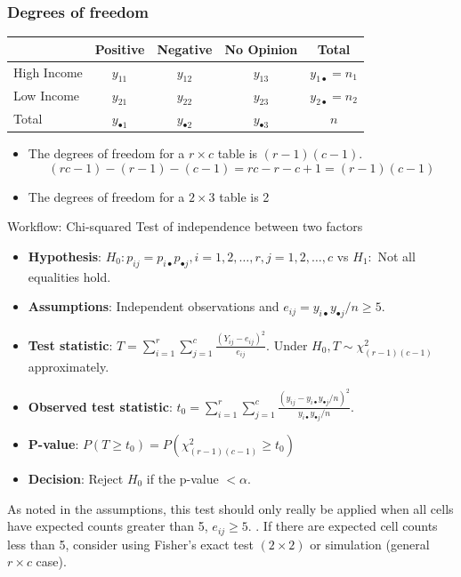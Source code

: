 \documentclass[a4paper]{article}
\begin{document}
\subsubsection{Degrees of freedom}
\begin{table}[H]
	\centering
	\begin{tabular}{@{}lccc|c@{}}
	\toprule
				& Positive  	      & Negative		    & No Opinion		  & Total                     \\ \midrule
	High Income & \( y_{11} \)		  & \( y_{12} \) 	    & \( y_{13} \) 		  & \( y_{1 \bullet} = n_1 \) \\
	Low Income  & \( y_{21} \) 		  & \( y_{22} \) 	    & \( y_{23} \) 		  & \( y_{2 \bullet} = n_2 \) \\ \midrule
	Total       & \( y_{\bullet 1} \) & \( y_{\bullet 2} \) & \( y_{\bullet 3} \) & \( n \) 				  \\ \bottomrule
	\end{tabular}
\end{table}
\begin{itemize}
	\item The degrees of freedom for a \( r \times c \) table is \( (r-1)(c-1) \).
	\[
		(rc-1)-(r-1)-(c-1) = rc-r-c+1 = (r-1)(c-1)
	\]
	\item The degrees of freedom for a \( 2 \times 3 \) table is 2
\end{itemize}
\begin{redbox}{Workflow: Chi-squared Test of independence between two factors}
	\begin{itemize}
		\item \textbf{Hypothesis}: \( H_0: p_{ij} = p_{i \bullet} p_{\bullet j}, i = 1,2,\dotsc,r, j = 1,2,\dotsc,c \) vs \( H_1: \) Not all equalities hold. 
		\item \textbf{Assumptions}: Independent observations and  \( e_{ij} =y_{i \bullet} y_{\bullet j}/n \geq 5 \).
		\item \textbf{Test statistic}: \( T = \sum\limits_{i=1}^{r}\sum\limits_{j=1}^{c} \frac{(Y_{ij} - e_{ij})^2}{e_{ij}} \). Under \( H_0, T \sim \chi^2_{(r-1)(c-1)} \) approximately.
		\item \textbf{Observed test statistic}: \( t_0 = \sum_{i=1}^{r}\sum_{j=1}^{c}\frac{(y_{ij} - y_{i \bullet} y_{\bullet j}/n)^2}{y_{i \bullet}y_{\bullet j}/n} \).
		\item \textbf{P-value}: \( P(T\geq t_0) = P(\chi^2_{(r-1)(c-1)} \geq t_0) \)
		\item \textbf{Decision}: Reject \( H_0 \) if the p-value \( < \alpha \).
	\end{itemize}
\end{redbox}
As noted in the assumptions, this test should only really be applied when all cells have expected counts greater than 5, \( e_{ij} \geq 5 \). . If there are expected cell counts less than 5, consider using Fisher's exact test \( (2 \times 2) \) or simulation (general \( r \times c \) case).
\end{document}
